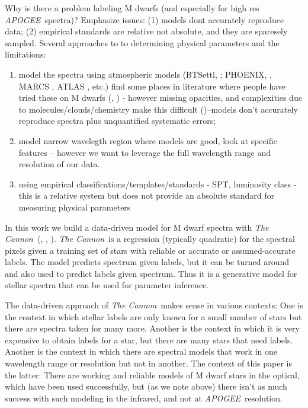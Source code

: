 \documentclass[modern]{aastex62}
\newcommand{\apogee}{\textsl{APOGEE}}
\newcommand{\thecannon}{\textsl{The Cannon}}
\begin{document}
Why is there a problem labeling M dwarfs (and especially for high res \apogee\ spectra)? Emphasize issues: (1) models dont accurately reproduce data; (2) empirical standards are relative not absolute, and they are sparesely sampled. Several approaches to to determining physical parameters and the limitations:

\begin{enumerate}
\item model the spectra using atmospheric models (BTSettl, \citealt{Allard:2011}; PHOENIX, \citealt{Husser:2013}, MARCS \citealt{Gustafsson:2008}, ATLAS \citealt{Castelli:2004}, etc.) find some places in literature where people have tried these on M dwarfs (\citealt{Rajpurohit:2014}, \citealt{Rajpurohit:2018}) - however missing opacities, and complexities due to molecules/clouds/chemistry make this difficult (\citealt{Allard:2013})--models don't accurately reproduce spectra plus unquantified systematic errors; 

\item model narrow wavelegth region where models are good, look at specific features -- however we want to leverage the full wavelength range and resolution of our data.

\item using empirical classifications/templates/standards - SPT, luminosity class - this is a relative system but does not provide an absolute standard for measuring physical parameters
\end{enumerate}

In this work we build a data-driven model for M dwarf spectra with \thecannon\ (\citealt{Ness:2015}, \citealt{Ho:2017a}, \citealt{Casey:2016}).
\thecannon\ is a regression (typically quadratic) for the spectral pixels given a training
set of stars with reliable or accurate or assumed-accurate labels.
The model predicts spectrum given labels, but it can be turned around and also
used to predict labels given spectrum.
Thus it is a generative model for stellar spectra that can be used for parameter inference.

The data-driven approach of \thecannon\ makes sense in various contexts:
One is the context in which stellar labels are only known for a small number of stars
but there are spectra taken for many more.
Another is the context in which it is very expensive to obtain labels for a star, but
there are many stars that need labels.
Another is the context in which there are spectral models that work in one wavelength
range or resolution but not in another.
The context of this paper is the latter:
There are working and reliable models of M dwarf stars in the optical, which have been
used successfully, but (as we note above) there isn't as much success with such modeling in the infrared,
and not at \apogee\ resolution.
\end{document}

